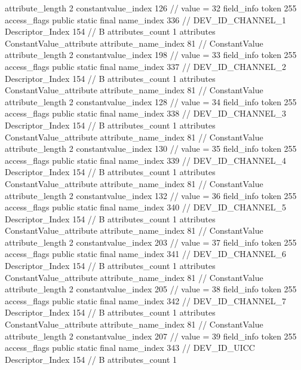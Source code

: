 {{{{{{{					attribute_length	2
					constantvalue_index	126		// value = 32
				}
				}
			}
			field_info {
				token	255
				access_flags	public static final
				name_index	336		// DEV_ID_CHANNEL_1
				Descriptor_Index	154		// B
				attributes_count	1
				attributes {
				ConstantValue_attribute {
					attribute_name_index	81		// ConstantValue
					attribute_length	2
					constantvalue_index	198		// value = 33
				}
				}
			}
			field_info {
				token	255
				access_flags	public static final
				name_index	337		// DEV_ID_CHANNEL_2
				Descriptor_Index	154		// B
				attributes_count	1
				attributes {
				ConstantValue_attribute {
					attribute_name_index	81		// ConstantValue
					attribute_length	2
					constantvalue_index	128		// value = 34
				}
				}
			}
			field_info {
				token	255
				access_flags	public static final
				name_index	338		// DEV_ID_CHANNEL_3
				Descriptor_Index	154		// B
				attributes_count	1
				attributes {
				ConstantValue_attribute {
					attribute_name_index	81		// ConstantValue
					attribute_length	2
					constantvalue_index	130		// value = 35
				}
				}
			}
			field_info {
				token	255
				access_flags	public static final
				name_index	339		// DEV_ID_CHANNEL_4
				Descriptor_Index	154		// B
				attributes_count	1
				attributes {
				ConstantValue_attribute {
					attribute_name_index	81		// ConstantValue
					attribute_length	2
					constantvalue_index	132		// value = 36
				}
				}
			}
			field_info {
				token	255
				access_flags	public static final
				name_index	340		// DEV_ID_CHANNEL_5
				Descriptor_Index	154		// B
				attributes_count	1
				attributes {
				ConstantValue_attribute {
					attribute_name_index	81		// ConstantValue
					attribute_length	2
					constantvalue_index	203		// value = 37
				}
				}
			}
			field_info {
				token	255
				access_flags	public static final
				name_index	341		// DEV_ID_CHANNEL_6
				Descriptor_Index	154		// B
				attributes_count	1
				attributes {
				ConstantValue_attribute {
					attribute_name_index	81		// ConstantValue
					attribute_length	2
					constantvalue_index	205		// value = 38
				}
				}
			}
			field_info {
				token	255
				access_flags	public static final
				name_index	342		// DEV_ID_CHANNEL_7
				Descriptor_Index	154		// B
				attributes_count	1
				attributes {
				ConstantValue_attribute {
					attribute_name_index	81		// ConstantValue
					attribute_length	2
					constantvalue_index	207		// value = 39
				}
				}
			}
			field_info {
				token	255
				access_flags	public static final
				name_index	343		// DEV_ID_UICC
				Descriptor_Index	154		// B
				attributes_count	1
}}}}}
